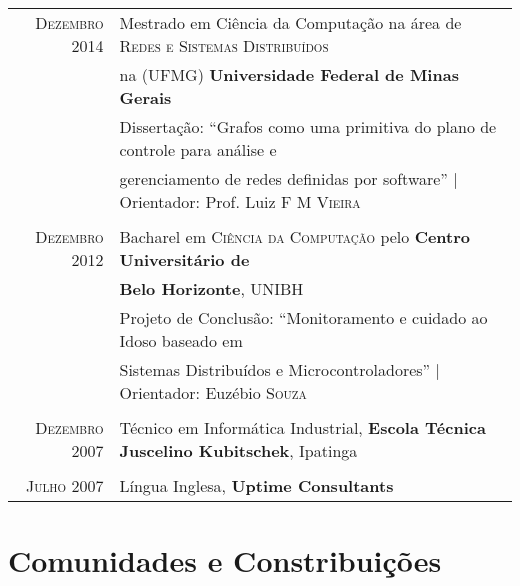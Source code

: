\documentclass[a4paper,10pt]{article} %
\begin{document}
\begin{tabular}{rl}
\textsc{Dezembro} 2014 & Mestrado em Ciência da Computação na área de
\textsc{Redes e Sistemas Distribuídos}
\\ & na (UFMG)
\textbf{Universidade Federal de Minas Gerais} \\
& Dissertação: ``Grafos como uma primitiva do plano de controle para análise e
\\ & gerenciamento de redes definidas por software''
| \small Orientador: Prof. Luiz \textsc{F M Vieira} \\
&\\


\textsc{Dezembro} 2012& Bacharel em \textsc{Ciência da Computação}
pelo \normalsize\textbf{Centro Universitário de}
\\ & \textbf{Belo Horizonte}, UNIBH \\
& Projeto de Conclusão: ``Monitoramento e cuidado ao Idoso baseado em
\\ & Sistemas Distribuídos e Microcontroladores''
| \small Orientador: Euzébio \textsc{Souza} \\
&\\


\textsc{Dezembro} 2007 & Técnico em Informática Industrial,
\textbf{Escola Técnica Juscelino Kubitschek}, Ipatinga \\
&\\


\textsc{Julho} 2007 & Língua Inglesa, \textbf{Uptime Consultants}
\end{tabular}





\section{Comunidades e Constribuições}
\end{document}

